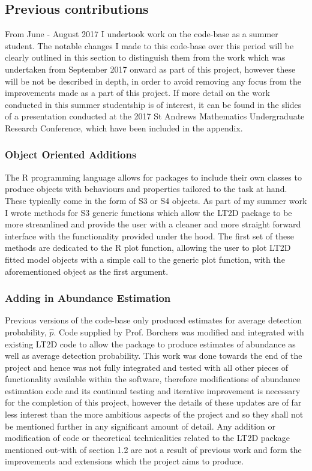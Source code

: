\documentclass[11pt]{article}
\begin{document}
\begin{multicols}{2}
\subsection{Previous contributions}

From June - August 2017 I undertook work on the code-base as a summer student. The notable changes I made to this code-base over this period will be clearly outlined in this section to distinguish them from the work which was undertaken from September 2017 onward as part of this project, however these will be not be described in depth, in order to avoid removing any focus from the improvements made as a part of this project. If more detail on the work conducted in this summer studentship is of interest, it can be found in the slides of a presentation conducted at the 2017 St Andrews Mathematics Undergraduate Research Conference, which have been included in the appendix. 

\subsubsection{Object Oriented Additions}
The R programming language allows for packages to include their own classes to produce objects with behaviours and properties tailored to the task at hand. These typically come in the form of S3 or S4 objects. As part of my summer work I wrote methods for S3 generic functions which allow the LT2D package to be more streamlined and provide the user with a cleaner and more straight forward interface with the functionality provided under the hood. The first set of these methods are dedicated to the R plot function, allowing the user to plot LT2D fitted model objects with a simple call to the generic plot function, with the aforementioned object as the first argument. 

\subsubsection{Adding in Abundance Estimation}
Previous versions of the code-base only produced estimates for average detection probability, $\hat{p}$. Code supplied by Prof. Borchers was modified and integrated with existing LT2D code to allow the package to produce estimates of abundance as well as average detection probability. This work was done towards the end of the project and hence was not fully integrated and tested with all other pieces of functionality available within the software, therefore modifications of abundance estimation code and its continual testing and iterative improvement is necessary for the completion of this project, however the details of these updates are of far less interest than the more ambitious aspects of the project and so they shall not be mentioned further in any significant amount of detail. Any addition or modification of code or theoretical technicalities related to the LT2D package mentioned out-with of section 1.2 are not a result of previous work and form the improvements and extensions which the project aims to produce.


\end{multicols}
\end{document}
